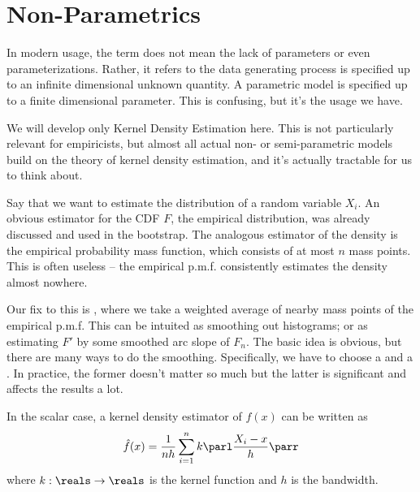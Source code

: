 \documentclass[10pt]{article}
\begin{document}
\begin{example}
\begin{enumerate}
	\end{enumerate}
\end{example}

\section{Non-Parametrics}

\begin{remark}
	In modern usage, the term  does not mean the lack of parameters or even parameterizations. Rather, it refers to the data generating process is specified up to an infinite dimensional unknown quantity. A parametric model is specified up to a finite dimensional parameter. This is confusing, but it's the usage we have.
\end{remark}

\begin{remark}
	We will develop only Kernel Density Estimation here. This is not particularly relevant for empiricists, but almost all actual non- or semi-parametric models build on the theory of kernel density estimation, and it's actually tractable for us to think about.
\end{remark}

\begin{model}
	Say that we want to estimate the distribution of a random variable $X_i$. An obvious estimator for the CDF $F$, the empirical distribution, was already discussed and used in the bootstrap. The analogous estimator of the density is the empirical probability mass function, which consists of at most $n$ mass points. This is often useless -- the empirical p.m.f. consistently estimates the density almost nowhere. 
	
	Our fix to this is , where we take a weighted average of nearby mass points of the empirical p.m.f. This can be intuited as smoothing out histograms; or as estimating $F'$ by some smoothed arc slope of $F_n$. The basic idea is obvious, but there are many ways to do the smoothing. Specifically, we have to choose a  and a . In practice, the former doesn't matter so much but the latter is significant and affects the results a lot.
\end{model}
	
	In the scalar case, a kernel density estimator of $f(x)$ can be written as \[\hat{f}(x) = \frac{1}{nh} \sum_{i=1}^n k\parl \frac{X_i-x}{h}\parr\]where $k: \reals \to \reals$ is the kernel function and $h$ is the bandwidth. 
	
\end{document}
